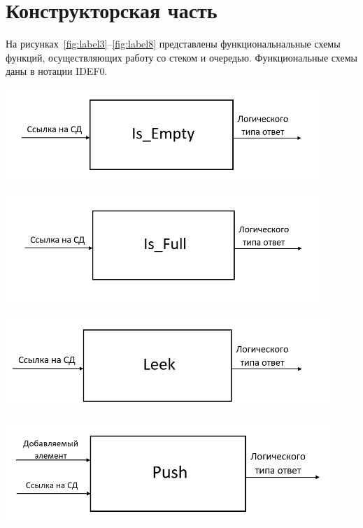 \documentclass[14pt]{article}
\begin{document}
	
	\newpage
	\section{Конструкторская часть}
	
	На рисунках~\ref{fig:label3}--\ref{fig:label8} представлены функциональнальные схемы функций, осуществляющих работу со стеком и очередью. Функциональные схемы даны в нотации IDEF0.
	
	\begin{center}
		\includegraphics[width = 0.9\textwidth, height = 0.2\textheight]{is_empty}
		\label{fig:label3}

		\includegraphics[width = 0.9\textwidth, height = 0.25\textheight]{is_full}
		\label{fig:label4}
		
		\includegraphics[width = 0.92\textwidth, height = 0.2\textheight]{leek}
		\label{fig:label5}
		
		\includegraphics[width = 0.92\textwidth, height = 0.2\textheight]{push}
		\label{fig:label6}
		

\end{center}
\end{document}
